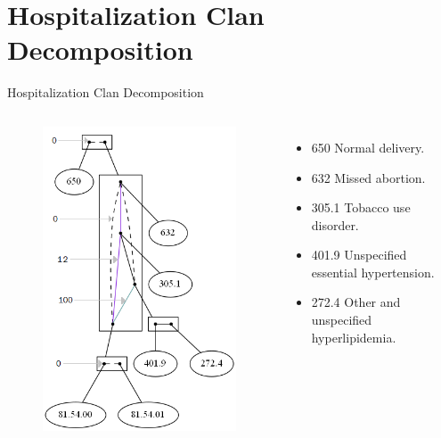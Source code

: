 \documentclass[11pt]{beamer}
\begin{document}
\section{Hospitalization Clan Decomposition}
	\begin{frame}{Hospitalization Clan Decomposition}
		\begin{columns}
            \begin{figure}
                \centering
                \includegraphics[width=0.9 \textwidth]{img/datahsp_withoutV_100_exp_values_conected_1.png}
            \end{figure}
         
            \begin{itemize}
                \item 650 Normal delivery.
                \item 632 Missed abortion.
                \item 305.1 Tobacco use disorder.
                \item 401.9 Unspecified essential hypertension.
                \item 272.4 Other and unspecified hyperlipidemia.
            \end{itemize}
        \end{columns}
	\end{frame}
\end{document}
